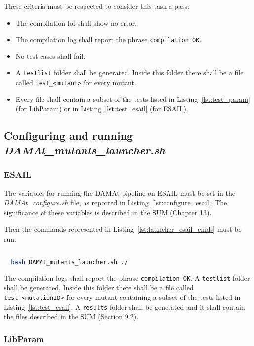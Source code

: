 These criteria must be respected to consider this task a pass:
\begin{itemize}
  \item The compilation lof shall show no error.
  \item The compilation log shall report the phrase \texttt{compilation OK}.
  \item No test cases shall fail.
  \item A \texttt{testlist} folder shall be generated. Inside this folder there shall be a file called \texttt{test\_<mutant>} for every mutant.
  \item Every file shall contain a subset of the tests listed in Listing~\ref{lst:test_param} (for LibParam) or in Listing~\ref{lst:test_esail} (for ESAIL).
\end{itemize}




\subsection{Configuring and running \emph{DAMAt\_mutants\_launcher.sh}}

\subsubsection{ESAIL}

The variables for running the DAMAt-pipeline on ESAIL must be set in the \emph{DAMAt\_configure.sh} file, as reported in Listing~\ref{lst:configure_esail}. The significance of these variables is described in the SUM (Chapter 13).

Then the commands represented in Listing~\ref{lst:launcher_esail_cmds} must be run.

  \begin{lstlisting}[language=bash, label={lst:launcher_esail_cmds}]

  bash DAMAt_mutants_launcher.sh ./

  \end{lstlisting}

  The compilation logs shall report the phrase \texttt{compilation OK}.
  A \texttt{testlist} folder shall be generated. Inside this folder there shall be a file called \texttt{test\_<mutationID>} for every mutant containing a subset of the tests listed in Listing~\ref{lst:test_esail}.
  A \texttt{results} folder shall be generated and it shall contain the files described in the SUM (Section 9.2).

\subsubsection{LibParam}

